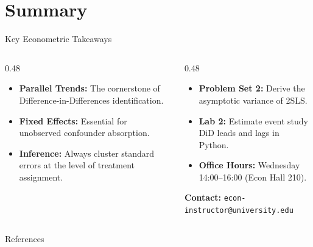 \documentclass[aspectratio=169, 9pt]{beamer}
\begin{document}
\section{Summary}
\begin{frame}{Key Econometric Takeaways}
    \begin{columns}[t]
        \begin{column}{0.48\textwidth}
            \par\vspace{0.3em}
            \begin{itemize}\setlength{\itemsep}{2.5pt}
                \item \textbf{Parallel Trends:} The cornerstone of Difference-in-Differences identification.
                \item \textbf{Fixed Effects:} Essential for unobserved confounder absorption.
                \item \textbf{Inference:} Always cluster standard errors at the level of treatment assignment.
            \end{itemize}
        \end{column}
        \begin{column}{0.48\textwidth}
            \par\vspace{0.3em}
            \begin{itemize}\setlength{\itemsep}{2.5pt}
                \item \textbf{Problem Set 2:} Derive the asymptotic variance of 2SLS.
                \item \textbf{Lab 2:} Estimate event study DiD leads and lags in Python.
                \item \textbf{Office Hours:} Wednesday 14:00--16:00 (Econ Hall 210).
            \end{itemize}
            \vspace{0.3em}
            \begin{takeaway}
                \textbf{Contact:} \texttt{econ-instructor@university.edu}
            \end{takeaway}
        \end{column}
    \end{columns}
\end{frame}

\begin{frame}[allowframebreaks]{References}
    \printbibliography
\end{frame}
\end{document}
